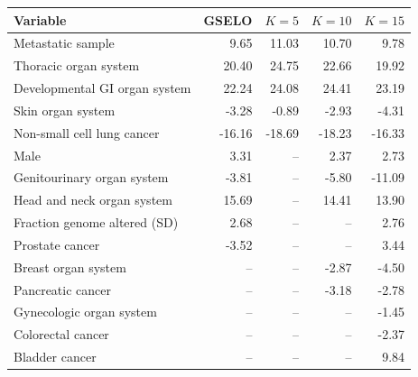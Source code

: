\begin{tabular}{lrrrr}
\toprule
Variable & GSELO & \(K=5\) & \(K=10\) & \(K=15\)\\
\midrule
Metastatic sample & 9.65 & 11.03 & 10.70 & 9.78\\
Thoracic organ system & 20.40 & 24.75 & 22.66 & 19.92\\
Developmental GI organ system & 22.24 & 24.08 & 24.41 & 23.19\\
Skin organ system & -3.28 & -0.89 & -2.93 & -4.31\\
Non-small cell lung cancer & -16.16 & -18.69 & -18.23 & -16.33\\
Male & 3.31 & -- & 2.37 & 2.73\\
Genitourinary organ system & -3.81 & -- & -5.80 & -11.09\\
Head and neck organ system & 15.69 & -- & 14.41 & 13.90\\
Fraction genome altered (SD) & 2.68 & -- & -- & 2.76\\
Prostate cancer & -3.52 & -- & -- & 3.44\\
Breast organ system & -- & -- & -2.87 & -4.50\\
Pancreatic cancer & -- & -- & -3.18 & -2.78\\
Gynecologic organ system & -- & -- & -- & -1.45\\
Colorectal cancer & -- & -- & -- & -2.37\\
Bladder cancer & -- & -- & -- & 9.84\\
\bottomrule
\end{tabular}
